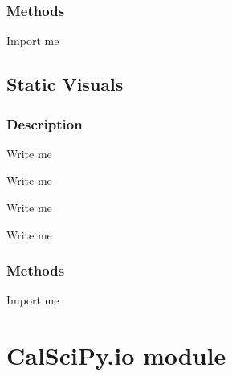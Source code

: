 \documentclass[letterpaper,10pt,english]{sphinxmanual}
\begin{document}
\subsection{Methods}
\label{\detokenize{Sub-Packages:id12}}
\begin{DUlineblock}{0em}
\item[] Import me
\end{DUlineblock}


\section{Static Visuals}
\label{\detokenize{Sub-Packages:static-visuals}}\label{\detokenize{Sub-Packages:static-visuals-module}}

\subsection{Description}
\label{\detokenize{Sub-Packages:id13}}
\begin{DUlineblock}{0em}
\item[] Write me
\item[] Write me
\item[] Write me
\item[] Write me
\end{DUlineblock}


\subsection{Methods}
\label{\detokenize{Sub-Packages:id14}}
\begin{DUlineblock}{0em}
\item[] Import me
\end{DUlineblock}

\sphinxstepscope


\chapter{CalSciPy.io module}
\label{\detokenize{CalSciPy.io:module-CalSciPy.io}}\label{\detokenize{CalSciPy.io:calscipy-io-module}}\label{\detokenize{CalSciPy.io::doc}}
\end{document}
